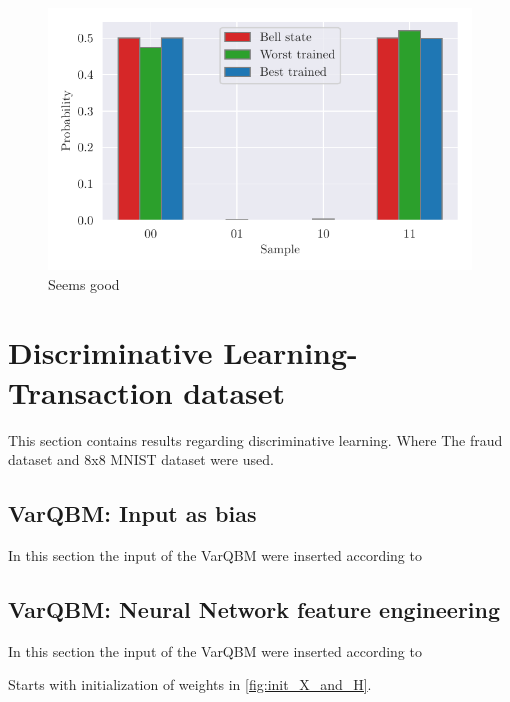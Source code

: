 \documentclass[../main.tex]{subfiles}
\begin{document}
\begin{figure}[h]
    \begin{center}
        \includegraphics{figures/H2_abRMS_lr01m099bar_10seeds.pdf}
        \caption{Seems good}
        \label{fig:nolabel}
    \end{center}
\end{figure}

\FloatBarrier
\section{Discriminative Learning-Transaction dataset}
This section contains results regarding discriminative learning. Where The fraud dataset and 8x8 MNIST dataset were used.

\subsection{VarQBM: Input as bias}
In this section the input of the VarQBM were inserted according to 
\subsection{VarQBM: Neural Network feature engineering}
In this section the input of the VarQBM were inserted according to 

Starts with initialization of weights in \autoref{fig:init_X_and_H}.
\end{document}
